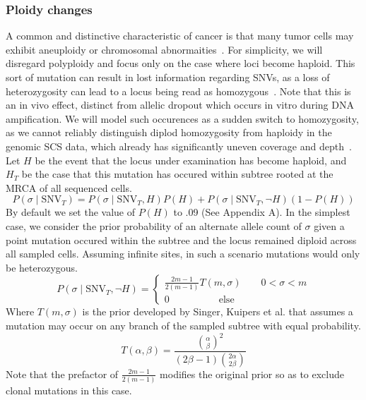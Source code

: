 \documentclass[../../main.tex]{subfiles}
\begin{document}
\subsubsection*{Ploidy changes}
A common and distinctive characteristic of cancer is that many tumor cells may exhibit aneuploidy or chromosomal abnormaities~\cite{gao2016punctuated, 21breasts, aneuploidy, merlo2006cancer, onecelltime}.
For simplicity, we will disregard polyploidy and focus only on the case where loci become haploid.
This sort of mutation can result in lost information regarding SNVs, as a loss of heterozygosity can lead to a locus being read as homozygous~\cite{sciphi}.
Note that this is an in vivo effect, distinct from allelic dropout which occurs in vitro during DNA ampification.
We will model such occurences as a sudden switch to homozygosity, as we cannot reliably distinguish diplod homozygosity from haploidy in the genomic SCS data, which already has significantly uneven coverage and depth~\cite{monovar, scprimer}.
Let $H$ be the event that the locus under examination has become haploid, and $H_T$ be the case that this mutation has occured within subtree rooted at the MRCA of all sequenced cells.
\begin{equation}
P(\sigma \mid \text{SNV}_T) = P(\sigma\mid\text{SNV}_T,H)P(H) + P(\sigma\mid\text{SNV}_T,\neg H)(1-P(H)) 
\end{equation}
By default we set the value of $P(H)$ to .09 (See Appendix A). In the simplest case, we consider the prior probability of an alternate allele count of $\sigma$ given a point mutation occured within the subtree and the locus remained diploid across all sampled cells.
Assuming infinite sites, in such a scenario mutations would only be heterozygous.
\begin{equation*}
P(\sigma\mid\text{SNV}_T,\neg H) = \begin{cases} \frac{2m-1}{2(m-1)} T(m,\sigma) \qquad 0<\sigma< m\\ 0 \qquad \qquad \quad \text{else}\end{cases}
\end{equation*}
Where $T(m,\sigma)$ is the prior developed by Singer, Kuipers et al. that assumes a mutation may occur on any branch of the sampled subtree with equal probability.
\begin{equation}\label{eq:T}
T(\alpha,\beta)=\frac{\binom{\alpha}{\beta}^2}{(2\beta-1)\binom{2\alpha}{2\beta}}
\end{equation}
Note that the prefactor of $\frac{2m-1}{2(m-1)}$ modifies the original prior so as to exclude clonal mutations in this case.
\end{document}
